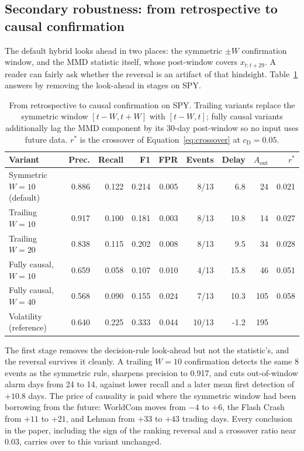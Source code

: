 \documentclass[pdflatex,sn-mathphys-num,iicol]{sn-jnl}
\begin{document}
\subsection{Secondary robustness: from retrospective to causal confirmation}
\label{sec:causal}
The default hybrid looks ahead in two places: the symmetric $\pm W$ confirmation window, and the MMD statistic itself, whose post-window covers $x_{t:t+29}$. A reader can fairly ask whether the reversal is an artifact of that hindsight. Table~\ref{tab:causal} answers by removing the look-ahead in stages on SPY.

\begin{table}[t]
\centering
\caption{From retrospective to causal confirmation on SPY. Trailing variants replace the symmetric window $[t-W,t+W]$ with $[t-W,t]$; fully causal variants additionally lag the MMD component by its 30-day post-window so no input uses future data. $r^{*}$ is the crossover of Equation~\eqref{eq:crossover} at $c_{\mathrm{D}}=0.05$.}
\label{tab:causal}
\scriptsize
\begin{tabular}{lrrrrrrrr}
\toprule
Variant & Prec. & Recall & F1 & FPR & Events & Delay & $A_{\mathrm{out}}$ & $r^{*}$\\
\midrule
Symmetric $W=10$ (default) & 0.886 & 0.122 & 0.214 & 0.005 & 8/13 & 6.8 & 24 & 0.021\\
Trailing $W=10$ & 0.917 & 0.100 & 0.181 & 0.003 & 8/13 & 10.8 & 14 & 0.027\\
Trailing $W=20$ & 0.838 & 0.115 & 0.202 & 0.008 & 8/13 & 9.5 & 34 & 0.028\\
Fully causal, $W=10$ & 0.659 & 0.058 & 0.107 & 0.010 & 4/13 & 15.8 & 46 & 0.051\\
Fully causal, $W=40$ & 0.568 & 0.090 & 0.155 & 0.024 & 7/13 & 10.3 & 105 & 0.058\\
Volatility (reference) & 0.640 & 0.225 & 0.333 & 0.044 & 10/13 & -1.2 & 195 & \\
\bottomrule
\end{tabular}
\end{table}

The first stage removes the decision-rule look-ahead but not the statistic's, and the reversal survives it cleanly. A trailing $W=10$ confirmation detects the same 8 events as the symmetric rule, sharpens precision to 0.917, and cuts out-of-window alarm days from 24 to 14, against lower recall and a later mean first detection of $+10.8$ days. The price of causality is paid where the symmetric window had been borrowing from the future: WorldCom moves from $-4$ to $+6$, the Flash Crash from $+11$ to $+21$, and Lehman from $+33$ to $+43$ trading days. Every conclusion in the paper, including the sign of the ranking reversal and a crossover ratio near 0.03, carries over to this variant unchanged.
\end{document}
